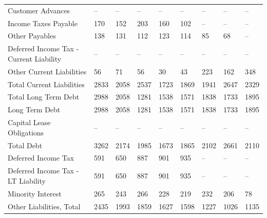 \documentclass[grad,numbers]{coppe}
\begin{document}
\begin{longtable}[t]{lllllllll}
  \hspace{1em}\hspace{1em}Customer Advances & -- & -- & -- & -- & -- & -- & -- & --\\
  \hspace{1em}\hspace{1em}Income Taxes Payable & 170 & 152 & 203 & 160 & 102 & -- & -- & --\\
  \hspace{1em}\hspace{1em}Other Payables & 138 & 131 & 112 & 123 & 114 & 85 & 68 & --\\
  \hspace{1em}\hspace{1em}Deferred Income Tax - Current Liability & -- & -- & -- & -- & -- & -- & -- & --\\
  \hspace{1em}\hspace{1em}Other Current Liabilities & 56 & 71 & 56 & 30 & 43 & 223 & 162 & 348\\
  \hspace{1em}Total Current Liabilities & 2833 & 2058 & 2537 & 1723 & 1869 & 1941 & 2647 & 2329\\
  Total \hspace{1em}\hspace{1em}Long Term Debt & 2988 & 2058 & 1281 & 1538 & 1571 & 1838 & 1733 & 1895\\
  Long Term Debt & 2988 & 2058 & 1281 & 1538 & 1571 & 1838 & 1733 & 1895\\
  \hspace{1em}\hspace{1em}Capital Lease Obligations & -- & -- & -- & -- & -- & -- & -- & --\\
  \hspace{1em}Total Debt & 3262 & 2174 & 1985 & 1673 & 1865 & 2102 & 2661 & 2110\\
  \hspace{1em}Deferred Income Tax & 591 & 650 & 887 & 901 & 935 & -- & -- & --\\
  \hspace{1em}\hspace{1em}Deferred Income Tax - LT Liability & 591 & 650 & 887 & 901 & 935 & -- & -- & --\\
  \hspace{1em}Minority Interest & 265 & 243 & 266 & 228 & 219 & 232 & 206 & 78\\
  \hspace{1em}Other Liabilities, Total & 2435 & 1993 & 1859 & 1627 & 1598 & 1227 & 1026 & 1135\\

\end{longtable}
\end{document}

